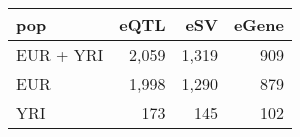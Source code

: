 
\begin{tabular}{l|r|r|r}
\hline
pop & eQTL & eSV & eGene\\
\hline
EUR + YRI & 2,059 & 1,319 & 909\\
\hline
EUR & 1,998 & 1,290 & 879\\
\hline
YRI & 173 & 145 & 102\\
\hline
\end{tabular}